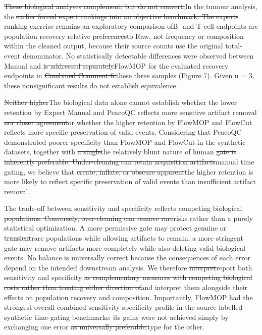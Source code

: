 \documentclass[
  11pt,
  a4paper,
]{article}
\begin{document}
{\color{revisionred}\sout{These biological analyses complement, but do
not convert,}}{\color{revisionblue}In the tumour analysis,} the
{\color{revisionred}\sout{earlier forced expert rankings into an
objective benchmark. The expert-ranking exercise remains an exploratory
comparison of}}{\color{revisionblue}B- and T-cell endpoints are
population recovery} relative
{\color{revisionred}\sout{preferences}}{\color{revisionblue}to Raw, not
frequency or composition within the cleaned output, because their source
counts use the original total-event denominator. No statistically
detectable differences were observed between Manual} and
{\color{revisionred}\sout{is addressed
separately}}{\color{revisionblue}FlowMOP for the evaluated recovery
endpoints} in {\color{revisionred}\sout{Combined Comment
6.}}{\color{revisionblue}these three samples (Figure 7). Given n = 3,
these nonsignificant results do not establish equivalence.}

{\color{revisionred}\sout{Neither higher}}{\color{revisionblue}The
biological data alone cannot establish whether the lower retention by
Expert Manual and PeacoQC reflects more sensitive artifact} removal
{\color{revisionred}\sout{nor closer agreement}}{\color{revisionblue}or
whether the higher retention by FlowMOP and FlowCut reflects more
specific preservation of valid events. Considering that PeacoQC
demonstrated poorer specificity than FlowMOP and FlowCut in the
synthetic datasets, together} with {\color{revisionred}\sout{a
single}}{\color{revisionblue}the relatively blunt nature of} human
{\color{revisionred}\sout{gate is inherently preferable. Under-cleaning
can retain acquisition artifacts}}{\color{revisionblue}manual time
gating, we believe} that {\color{revisionred}\sout{create, inflate, or
obscure apparent}}{\color{revisionblue}the higher retention is more
likely to reflect specific preservation of valid events than
insufficient artifact removal.}

{\color{revisionblue}The trade-off between sensitivity and specificity
reflects competing} biological {\color{revisionred}\sout{populations.
Conversely, over-cleaning can remove rare}}{\color{revisionblue}risks
rather than a purely statistical optimization. A more permissive gate
may protect genuine} or
{\color{revisionred}\sout{transient}}{\color{revisionblue}rare
populations while allowing artifacts to remain; a more stringent gate
may remove artifacts more completely while also deleting valid}
biological events. {\color{revisionblue}No balance is universally
correct because the consequences of each error depend on the intended
downstream analysis.} We therefore
{\color{revisionred}\sout{interpret}}{\color{revisionblue}report both}
sensitivity and specificity {\color{revisionred}\sout{as complementary
measures with competing biological costs rather than treating either
direction of}}{\color{revisionblue}and interpret them alongside their
effects on population recovery and composition. Importantly, FlowMOP had
the strongest overall combined sensitivity-specificity profile in the
source-labelled synthetic time-gating benchmarks: its gains were not
achieved simply by exchanging one} error {\color{revisionred}\sout{as
universally preferable.}}{\color{revisionblue}type for the other.}
\end{document}
